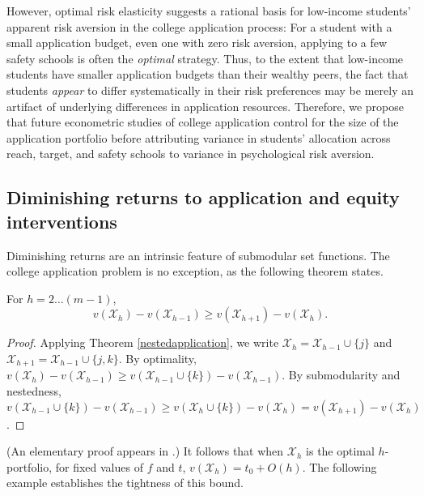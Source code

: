 However, optimal risk elasticity suggests a rational basis for low-income students' apparent risk aversion in the college application process: For a student with a small application budget, even one with zero risk aversion, applying to a few safety schools is often the \emph{optimal} strategy. %
Thus, to the extent that low-income students have smaller application budgets than their wealthy peers, the fact that students \emph{appear} to differ systematically in their risk preferences may be merely an artifact of underlying differences in application resources. Therefore, we propose that future econometric studies of college application control for the size of the application portfolio before attributing variance in students' allocation across reach, target, and safety schools to variance in psychological risk aversion. %


\subsection{Diminishing returns to application and equity interventions}

Diminishing returns are an intrinsic feature of submodular set functions. The college application problem is no exception, as the following theorem states.

\begin{theorem} \label{concavityinh}
For $h = 2 \dots (m-1)$,
\begin{equation*}
v(\mathcal{X}_h) - v(\mathcal{X}_{h-1}) \geq v(\mathcal{X}_{h+1}) - v(\mathcal{X}_{h}).
\end{equation*} 
\end{theorem}

\begin{proof}
Applying Theorem \ref{nestedapplication}, we write $\mathcal{X}_h = \mathcal{X}_{h-1} \cup\{j\}$ and $\mathcal{X}_{h+1} = \mathcal{X}_{h-1} \cup\{j, k\}$. By optimality, $v(\mathcal{X}_h) - v(\mathcal{X}_{h-1}) \geq v(\mathcal{X}_{h-1}\cup\{k\}) - v(\mathcal{X}_{h-1})$. By submodularity and nestedness, $v(\mathcal{X}_{h-1}\cup\{k\}) - v(\mathcal{X}_{h-1}) \geq  v(\mathcal{X}_{h}\cup\{k\}) - v(\mathcal{X}_{h}) = v(\mathcal{X}_{h+1}) - v(\mathcal{X}_{h})$.
\end{proof}

\noindent (An elementary proof appears in \cite{kapur2022}.) It follows that when $\mathcal{X}_h$ is the optimal $h$-portfolio, for fixed values of $f$ and $t$, $v(\mathcal{X}_h) = t_0 + O(h)$. The following example establishes the tightness of this bound.

